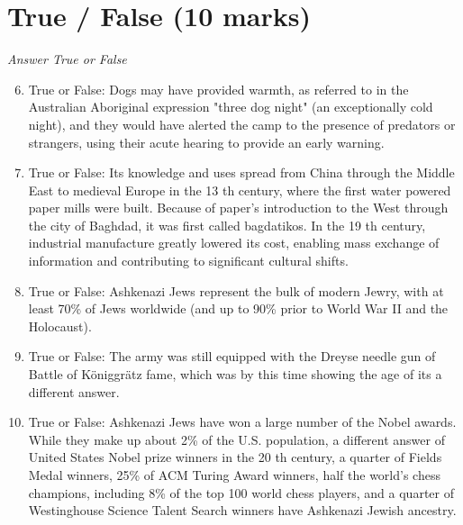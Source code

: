 \documentclass[12pt]{article}
\begin{document}
\section*{True / False (10 marks)}
\textit{Answer True or False}
\begin{enumerate}[label=\arabic*.]
\setcounter{enumi}{5}
\item True or False: Dogs may have provided warmth, as referred to in the Australian Aboriginal expression "three dog night" (an exceptionally cold night), and they would have alerted the camp to the presence of predators or strangers, using their acute hearing to provide an early warning.
\item True or False: Its knowledge and uses spread from China through the Middle East to medieval Europe in the 13 th century, where the first water powered paper mills were built. Because of paper's introduction to the West through the city of Baghdad, it was first called bagdatikos. In the 19 th century, industrial manufacture greatly lowered its cost, enabling mass exchange of information and contributing to significant cultural shifts.
\item True or False: Ashkenazi Jews represent the bulk of modern Jewry, with at least 70\% of Jews worldwide (and up to 90\% prior to World War II and the Holocaust).
\item True or False: The army was still equipped with the Dreyse needle gun of Battle of Königgrätz fame, which was by this time showing the age of its a different answer.
\item True or False: Ashkenazi Jews have won a large number of the Nobel awards. While they make up about 2\% of the U.S. population, a different answer of United States Nobel prize winners in the 20 th century, a quarter of Fields Medal winners, 25\% of ACM Turing Award winners, half the world's chess champions, including 8\% of the top 100 world chess players, and a quarter of Westinghouse Science Talent Search winners have Ashkenazi Jewish ancestry.
\end{enumerate}
\end{document}
